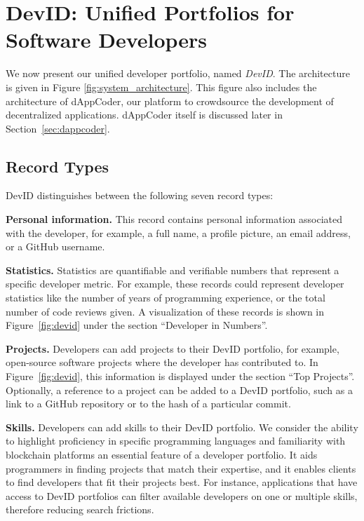 \section{DevID: Unified Portfolios for Software Developers}
\label{sec:devid_architecture}
We now present our unified developer portfolio, named \emph{DevID}.
The architecture is given in Figure \ref{fig:system_architecture}.
This figure also includes the architecture of dAppCoder, our platform to crowdsource the development of decentralized applications.
dAppCoder itself is discussed later in Section~\ref{sec:dappcoder}.

\subsection{Record Types}
\label{subsec:record_types}
DevID distinguishes between the following seven record types:

\textbf{Personal information.}
This record contains personal information associated with the developer, for example, a full name, a profile picture, an email address, or a GitHub username.

\textbf{Statistics.}
Statistics are quantifiable and verifiable numbers that represent a specific developer metric.
For example, these records could represent developer statistics like the number of years of programming experience, or the total number of code reviews given.
A visualization of these records is shown in Figure~\ref{fig:devid} under the section \enquote{Developer in Numbers}.

\textbf{Projects.}
Developers can add projects to their DevID portfolio, for example, open-source software projects where the developer has contributed to.
In Figure~\ref{fig:devid}, this information is displayed under the section \enquote{Top Projects}.
Optionally, a reference to a project can be added to a DevID portfolio, such as a link to a GitHub repository or to the hash of a particular commit.

\textbf{Skills.}
Developers can add skills to their DevID portfolio.
We consider the ability to highlight proficiency in specific programming languages and familiarity with blockchain platforms an essential feature of a developer portfolio.
It aids programmers in finding projects that match their expertise, and it enables clients to find developers that fit their projects best.
For instance, applications that have access to DevID portfolios can filter available developers on one or multiple skills, therefore reducing search frictions.

